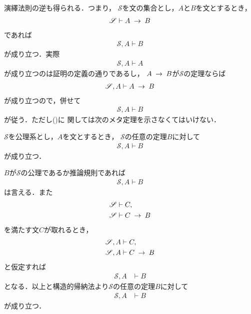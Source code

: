 	演繹法則の逆も得られる．つまり，
	$\mathscr{S}$を文の集合とし，$A$と$B$を文とするとき，
	\begin{align}
		\mathscr{S} \vdash A \hspace{0.25em}\rightarrow\hspace{0.25em} B
	\end{align}
	であれば
	\begin{align}
		\mathscr{S}, A \vdash B
	\end{align}
	が成り立つ．実際
	\begin{align}
		\mathscr{S}, A \vdash A
	\end{align}
	が成り立つのは証明の定義の通りであるし，
	$A \hspace{0.25em}\rightarrow\hspace{0.25em} B$が$\mathscr{S}$の定理ならば
	\begin{align}
		\mathscr{S}, A \vdash A \hspace{0.25em}\rightarrow\hspace{0.25em} B
		\label{fom:inversion_of_deduction_theorem}
	\end{align}
	が成り立つので，併せて
	\begin{align}
		\mathscr{S}, A \vdash B
	\end{align}
	が従う．ただし()に
	関しては次のメタ定理を示さなくてはいけない．
	
	\begin{screen}
		\begin{metathm}[公理が増えても証明可能]
			$\mathscr{S}$を公理系とし，$A$を文とするとき，
			$\mathscr{S}$の任意の定理$B$に対して
			\begin{align}
				\mathscr{S}, A \vdash B
			\end{align}
			が成り立つ．
		\end{metathm}
	\end{screen}
	
	\begin{metaprf}
		$B$が$\mathscr{S}$の公理であるか推論規則であれば
		\begin{align}
			\mathscr{S}, A \vdash B
		\end{align}
		は言える．また
		\begin{align}
			\mathscr{S} &\vdash C, \\
			\mathscr{S} &\vdash C \hspace{0.25em}\rightarrow\hspace{0.25em} B
		\end{align}
		を満たす文$C$が取れるとき，
		\begin{align}
			\mathscr{S}, A &\vdash C, \\
			\mathscr{S}, A &\vdash C \hspace{0.25em}\rightarrow\hspace{0.25em} B
		\end{align}
		と仮定すれば
		\begin{align}
			\mathscr{S}, A &\vdash B
		\end{align}
		となる．以上と構造的帰納法より$\mathscr{S}$の任意の定理$B$に対して
		\begin{align}
			\mathscr{S}, A &\vdash B
		\end{align}
		が成り立つ．
		\QED
	\end{metaprf}
